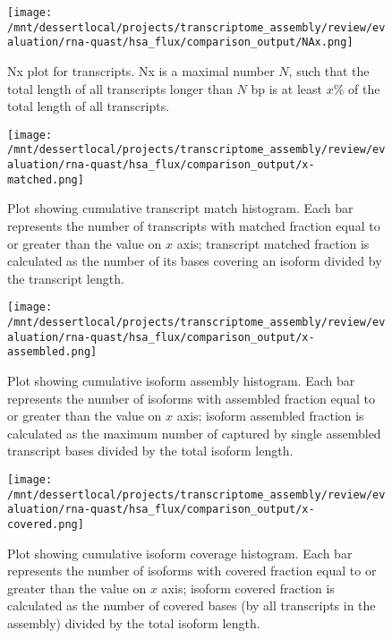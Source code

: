 \documentclass[12pt,a4paper]{article}
\begin{document}
\begin{figure}[t]
\centering
\texttt{[image: /mnt/dessertlocal/projects/transcriptome\_assembly/review/evaluation/rna-quast/hsa\_flux/comparison\_output/NAx.png]}
\caption{Nx plot for transcripts. Nx is a maximal number $N$, such that the total length of all transcripts longer than $N$ bp is at least $x\%$ of the total length of all transcripts.}
\end{figure}
\FloatBarrier
\clearpage


\begin{figure}[t]
\centering
\texttt{[image: /mnt/dessertlocal/projects/transcriptome\_assembly/review/evaluation/rna-quast/hsa\_flux/comparison\_output/x-matched.png]}
\caption{Plot showing cumulative transcript match histogram. Each bar represents the number of transcripts with matched fraction equal to or greater than the value on $x$ axis; transcript matched fraction is calculated as the number of its bases covering an isoform divided by the transcript length.}
\end{figure}
\FloatBarrier
\clearpage


\begin{figure}[t]
\centering
\texttt{[image: /mnt/dessertlocal/projects/transcriptome\_assembly/review/evaluation/rna-quast/hsa\_flux/comparison\_output/x-assembled.png]}
\caption{Plot showing cumulative isoform assembly histogram. Each bar represents the number of isoforms with assembled fraction equal to or greater than the value on $x$ axis; isoform assembled fraction is calculated as the maximum number of captured by single assembled transcript bases divided by the total isoform length.}
\end{figure}
\FloatBarrier
\clearpage


\begin{figure}[t]
\centering
\texttt{[image: /mnt/dessertlocal/projects/transcriptome\_assembly/review/evaluation/rna-quast/hsa\_flux/comparison\_output/x-covered.png]}
\caption{Plot showing cumulative isoform coverage histogram. Each bar represents the number of isoforms with covered fraction equal to or greater than the value on $x$ axis; isoform covered fraction is calculated as the number of covered bases (by all transcripts in the assembly) divided by the total isoform length.}
\end{figure}
\FloatBarrier
\clearpage
\end{document}
